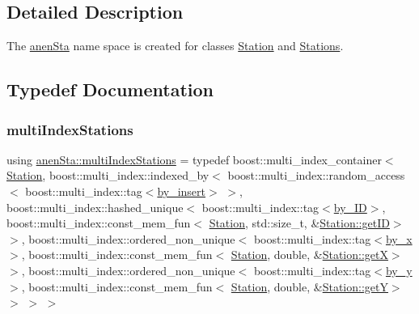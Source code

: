 \subsection{Detailed Description}
The \mbox{\hyperlink{namespaceanen_sta}{anen\+Sta}} name space is created for classes \mbox{\hyperlink{classanen_sta_1_1_station}{Station}} and \mbox{\hyperlink{classanen_sta_1_1_stations}{Stations}}. 

\subsection{Typedef Documentation}
\mbox{\label{namespaceanen_sta_a36826977aea7dbb351b814cceb511330}} 
\subsubsection{\texorpdfstring{multi\+Index\+Stations}{multiIndexStations}}
{\footnotesize\ttfamily using \mbox{\hyperlink{namespaceanen_sta_a36826977aea7dbb351b814cceb511330}{anen\+Sta\+::multi\+Index\+Stations}} = typedef boost\+::multi\+\_\+index\+\_\+container$<$ \mbox{\hyperlink{classanen_sta_1_1_station}{Station}}, boost\+::multi\+\_\+index\+::indexed\+\_\+by$<$ boost\+::multi\+\_\+index\+::random\+\_\+access$<$ boost\+::multi\+\_\+index\+::tag$<$\mbox{\hyperlink{structanen_sta_1_1by__insert}{by\+\_\+insert}}$>$ $>$, boost\+::multi\+\_\+index\+::hashed\+\_\+unique$<$ boost\+::multi\+\_\+index\+::tag$<$\mbox{\hyperlink{structanen_sta_1_1by___i_d}{by\+\_\+\+ID}}$>$, boost\+::multi\+\_\+index\+::const\+\_\+mem\+\_\+fun$<$ \mbox{\hyperlink{classanen_sta_1_1_station}{Station}}, std\+::size\+\_\+t, \&\mbox{\hyperlink{classanen_sta_1_1_station_a7da5e30ee0d25653333630aa61ca5257}{Station\+::get\+ID}}$>$ $>$, boost\+::multi\+\_\+index\+::ordered\+\_\+non\+\_\+unique$<$ boost\+::multi\+\_\+index\+::tag$<$\mbox{\hyperlink{structanen_sta_1_1by__x}{by\+\_\+x}}$>$, boost\+::multi\+\_\+index\+::const\+\_\+mem\+\_\+fun$<$ \mbox{\hyperlink{classanen_sta_1_1_station}{Station}}, double, \&\mbox{\hyperlink{classanen_sta_1_1_station_a8f4b152659b571ef4d14159527d2037d}{Station\+::getX}}$>$ $>$, boost\+::multi\+\_\+index\+::ordered\+\_\+non\+\_\+unique$<$ boost\+::multi\+\_\+index\+::tag$<$\mbox{\hyperlink{structanen_sta_1_1by__y}{by\+\_\+y}}$>$, boost\+::multi\+\_\+index\+::const\+\_\+mem\+\_\+fun$<$ \mbox{\hyperlink{classanen_sta_1_1_station}{Station}}, double, \&\mbox{\hyperlink{classanen_sta_1_1_station_adefc7f1b643ef4542580fd05fbf96b60}{Station\+::getY}}$>$ $>$ $>$ $>$}

